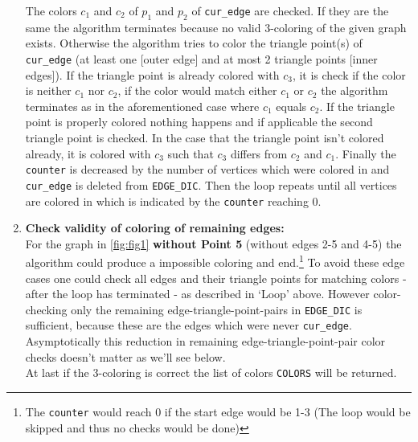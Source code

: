 \documentclass[english]{scrartcl}
\newcommand{\code}{\texttt}
\begin{document}
\begin{enumerate}
    The colors $c_1$ and $c_2$ of $p_1$ and $p_2$ of \code{cur\_edge} are checked. If they are the same the algorithm terminates because no valid 3-coloring of the given graph exists. Otherwise the algorithm tries to color the triangle point(s) of \code{cur\_edge} (at least one [outer edge] and at most 2 triangle points [inner edges]). If the triangle point is already colored with $c_3$, it is check if the color is neither $c_1$ nor $c_2$, if the color would match either $c_1$ or $c_2$ the algorithm terminates as in the aforementioned case where $c_1$ equals $c_2$. If the triangle point is properly colored nothing happens and if applicable the second triangle point is checked. In the case that the triangle point isn't colored already, it is colored with $c_3$ such that $c_3$ differs from $c_2$ and $c_1$. Finally the \code{counter} is decreased by the number of vertices which were colored in and \code{cur\_edge} is deleted from \code{EDGE\_DIC}. Then the loop repeats until all vertices are colored in which is indicated by the \code{counter} reaching 0.
    \item \textbf{Check validity of coloring of remaining edges:}\\For the graph in \autoref{fig:fig1} \textbf{without Point 5} (without edges 2-5 and 4-5) the algorithm could produce a impossible coloring and end.\footnote{The \code{counter} would reach 0 if the start edge would be 1-3 (The loop would be skipped and thus no checks would be done)} To avoid these edge cases one could check all edges and their triangle points for matching colors - after the loop has terminated - as described in \enquote*{Loop} above. However color-checking only the remaining edge-triangle-point-pairs in \code{EDGE\_DIC} is sufficient, because these are the edges which were never \code{cur\_edge}. Asymptotically this reduction in remaining edge-triangle-point-pair color checks doesn't matter as we'll see below. \\At last if the 3-coloring is correct the list of colors \code{COLORS} will be returned.
\end{enumerate}
\end{document}
